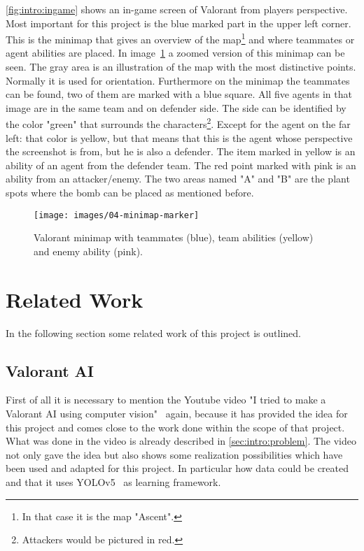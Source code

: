 \autoref{fig:intro:ingame} shows an in-game screen of Valorant from players perspective. Most 
important for this project is the blue marked part in the upper left corner. This is the minimap that 
gives an overview of the map\footnote{In that case it is the map "Ascent".} and where teammates or 
agent abilities are placed. In image~\ref{fig:intro:minimap} a zoomed version of this minimap can be 
seen. The gray area is an illustration of the map with the most distinctive points. Normally it is used 
for orientation. Furthermore on the minimap the teammates can be found, two of them are marked 
with a blue square. All five agents in that image are in the same team and on defender side. The side 
can be identified by the color "green" that surrounds the characters\footnote{Attackers would be 
pictured in red.}.  Except for the agent on the far left: that color is yellow, but that means that this is 
the agent whose perspective the screenshot is from, but he is also a defender. The item marked in 
yellow is an ability of an agent from the defender team. The red point marked with pink is an ability 
from an attacker/enemy. The two areas named "A" and "B" are the plant spots where the bomb can 
be placed as mentioned before.

\begin{figure}
	\centering
	\texttt{[image: images/04-minimap-marker]}
	\caption[Valorant minimap]{Valorant minimap with teammates (blue), team abilities (yellow) and 
	enemy ability (pink).}
	\label{fig:intro:minimap}
\end{figure}


\section{Related Work}\label{sec:intro:relatedWork}

In the following section some related work of this project is outlined.

\subsection[Video: Valorant AI]{Valorant AI}\label{subsec:intro:video}

First of all it is necessary to mention the Youtube video "I tried to make a Valorant AI using computer 
vision"~\cite{river2021} again, because it has provided the idea for this project and comes close to 
the work done within the scope of that project. What was done in the video is already described in 
\autoref{sec:intro:problem}. The video not only gave the idea but also shows some realization 
possibilities which have been used and adapted for this project. In particular how data could be 
created and that it uses YOLOv5~\cite{jocher2020} as learning framework.

